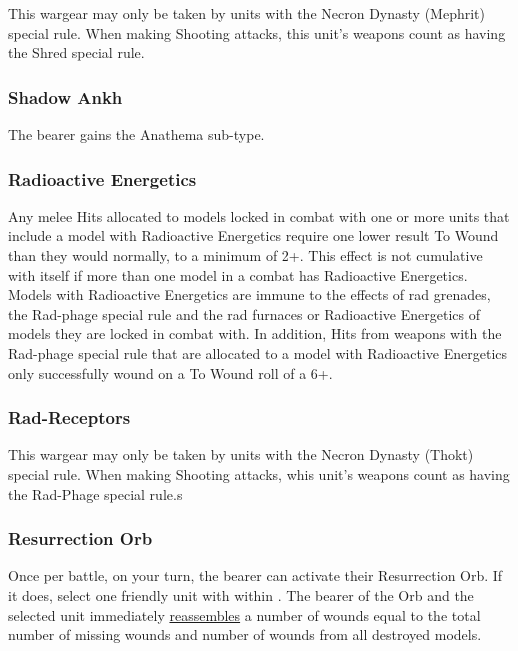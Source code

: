 This wargear may only be taken by units with the Necron Dynasty (Mephrit) special rule. When making Shooting attacks, this unit's weapons count as having the Shred special rule.

\subsubsection{Shadow Ankh} \label{Shadow Ankh}

The bearer gains the Anathema sub-type.

\subsubsection{Radioactive Energetics} \label{Radioactive Energetics}

Any melee Hits allocated to models locked in combat with one or more units that include a model with Radioactive Energetics require one lower result To Wound than they would normally, to a minimum of 2+. This effect is not cumulative with itself if more than one model in a combat has Radioactive Energetics. Models with Radioactive Energetics are immune to the effects of rad grenades, the Rad-phage special rule and the rad furnaces or Radioactive Energetics of models they are locked in combat with. In addition, Hits from weapons with the Rad-phage special rule that are allocated to a model with Radioactive Energetics only successfully wound on a To Wound roll of a 6+. 

\subsubsection{Rad-Receptors} \label{Rad Receptors}

This wargear may only be taken by units with the Necron Dynasty (Thokt) special rule. When making Shooting attacks, whis unit's weapons count as having the Rad-Phage special rule.s

\subsubsection{Resurrection Orb} \label{Resurrection Orb}

Once per battle, on your turn, the bearer can activate their Resurrection Orb. If it does, select one friendly unit with  within . The bearer of the Orb and the selected unit immediately \textcolor{violet}{\hyperref[Reanimation Protocols]{reassembles}} a number of wounds equal to the total number of missing wounds and number of wounds from all destroyed models.

